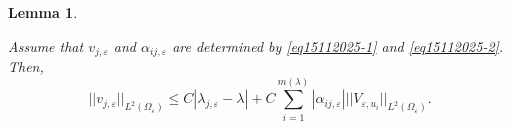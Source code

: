 \documentclass[11pt,reqno]{article}
\newtheorem{lemma}[teo]{Lemma}
\numberwithin{equation}{section}
\newcommand\e\varepsilon
\newcommand\la\lambda
\renewcommand\O\Omega
\newcommand{\Ying}{\color{red}}
\begin{document}
     \begin{lemma}\label{lem1511}

        Assume that $v_{j,\e}$ and $\alpha_{ij,\e}$ are determined by \eqref{eq15112025-1} and \eqref{eq15112025-2}. Then,
         \begin{equation}
              ||v_{j,\e}||_{L^2(\O_\e)}\le C|\lambda_{j,\e}-\lambda|+C\sum_{i=1}^{m(\la)}|\alpha_{ij,\e}| ||  V_{\e,u_i}||_{L^2(\O_\e)}.
         \end{equation}

     \end{lemma}
\end{document}
